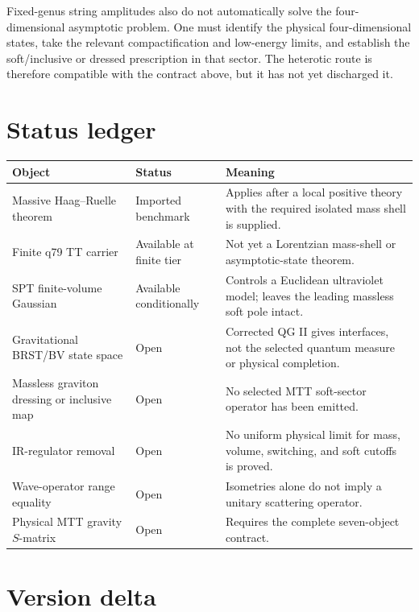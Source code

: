 \documentclass[11pt]{article}
\begin{document}
Fixed-genus string amplitudes also do not automatically solve the
four-dimensional asymptotic problem. One must identify the physical
four-dimensional states, take the relevant compactification and low-energy
limits, and establish the soft/inclusive or dressed prescription in that
sector. The heterotic route is therefore compatible with the contract above,
but it has not yet discharged it.

\section{Status ledger}

\begin{center}
\small
\begin{tabular}{p{}p{}p{}}
\hline
Object & Status & Meaning \\
\hline
Massive Haag--Ruelle theorem & Imported benchmark & Applies after a local positive theory with the required isolated mass shell is supplied. \\
Finite q79 TT carrier & Available at finite tier & Not yet a Lorentzian mass-shell or asymptotic-state theorem. \\
SPT finite-volume Gaussian & Available conditionally & Controls a Euclidean ultraviolet model; leaves the leading massless soft pole intact. \\
Gravitational BRST/BV state space & Open & Corrected QG II gives interfaces, not the selected quantum measure or physical completion. \\
Massless graviton dressing or inclusive map & Open & No selected MTT soft-sector operator has been emitted. \\
IR-regulator removal & Open & No uniform physical limit for mass, volume, switching, and soft cutoffs is proved. \\
Wave-operator range equality & Open & Isometries alone do not imply a unitary scattering operator. \\
Physical MTT gravity $S$-matrix & Open & Requires the complete seven-object contract. \\
\hline
\end{tabular}
\normalsize
\end{center}

\section{Version delta}
\end{document}
